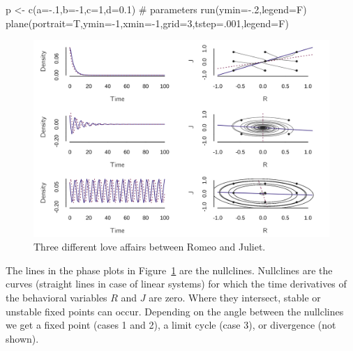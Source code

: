 \documentclass[
  a4paper,
  DIV=11,
  numbers=noendperiod,
  oneside]{scrreprt}
\newenvironment{Shaded}{\begin{snugshade}}{\end{snugshade}}
\newcommand{\AttributeTok}[1]{\textcolor[rgb]{0.40,0.45,0.13}{#1}}
\newcommand{\CommentTok}[1]{\textcolor[rgb]{0.37,0.37,0.37}{#1}}
\newcommand{\DecValTok}[1]{\textcolor[rgb]{0.68,0.00,0.00}{#1}}
\newcommand{\FloatTok}[1]{\textcolor[rgb]{0.68,0.00,0.00}{#1}}
\newcommand{\FunctionTok}[1]{\textcolor[rgb]{0.28,0.35,0.67}{#1}}
\newcommand{\NormalTok}[1]{\textcolor[rgb]{0.00,0.23,0.31}{#1}}
\newcommand{\OtherTok}[1]{\textcolor[rgb]{0.00,0.23,0.31}{#1}}
\newcommand{\SpecialCharTok}[1]{\textcolor[rgb]{0.37,0.37,0.37}{#1}}
\begin{document}
\begin{Shaded}
\begin{Highlighting}[]
\NormalTok{p }\OtherTok{\textless{}{-}} \FunctionTok{c}\NormalTok{(}\AttributeTok{a=}\SpecialCharTok{{-}}\NormalTok{.}\DecValTok{1}\NormalTok{,}\AttributeTok{b=}\SpecialCharTok{{-}}\DecValTok{1}\NormalTok{,}\AttributeTok{c=}\DecValTok{1}\NormalTok{,}\AttributeTok{d=}\FloatTok{0.1}\NormalTok{) }\CommentTok{\# parameters}
\FunctionTok{run}\NormalTok{(}\AttributeTok{ymin=}\SpecialCharTok{{-}}\NormalTok{.}\DecValTok{2}\NormalTok{,}\AttributeTok{legend=}\NormalTok{F)}
\FunctionTok{plane}\NormalTok{(}\AttributeTok{portrait=}\NormalTok{T,}\AttributeTok{ymin=}\SpecialCharTok{{-}}\DecValTok{1}\NormalTok{,}\AttributeTok{xmin=}\SpecialCharTok{{-}}\DecValTok{1}\NormalTok{,}\AttributeTok{grid=}\DecValTok{3}\NormalTok{,}\AttributeTok{tstep=}\NormalTok{.}\DecValTok{001}\NormalTok{,}\AttributeTok{legend=}\NormalTok{F)}
\end{Highlighting}
\end{Shaded}

\begin{figure}

{\centering \includegraphics{media/ch4n/fig-ch4n-img9-old-57.png}

}

\caption{\label{fig-ch4n-img9-old-57}Three different love affairs
between Romeo and Juliet.}

\end{figure}

The lines in the phase plots in Figure~\ref{fig-ch4n-img9-old-57} are
the nullclines. Nullclines are the curves (straight lines in case of
linear systems) for which the time derivatives of the behavioral
variables \(R\) and \(J\) are zero. Where they intersect, stable or
unstable fixed points can occur. Depending on the angle between the
nullclines we get a fixed point (cases 1 and 2), a limit cycle (case 3),
or divergence (not shown).
\end{document}
